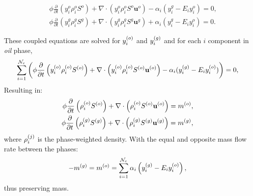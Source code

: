            \begin{subequations}
             \begin{align}
               && \phi  \displaystyle\frac{\partial}{\partial t}\left(y_{i}^{o}\rho_i^{o}S^{o} \right) + \nabla\cdot\left(y_{i}^{o}\rho_i^{o}S^{o}\mathbf{u}^{o}  \right) - \alpha_i (y_i^g - E_i y_i^o)  = 0, \label{oil-comp-i} \\
               && \phi \displaystyle\frac{\partial}{\partial t}\left(y_{i}^{g}\rho_i^{g}S^{g}  \right) +  \nabla\cdot\left( y_{i}^{g}\rho_i^{g}S^{g}\mathbf{u}^{g}  \right) + \alpha_i (y_i^g - E_i y_i^o) = 0. \label{water-comp-i}
            \end{align} %
           \end{subequations}

These coupled equations are solved for $\mfr[y]{i}{o}$ and $\mfr[y]{i}{g}$ and for each $i$ component in {\it oil} phase, 
           \begin{equation}
              \summation_{i=1}^{{\cal N}_{c}} \bigg(\phi \displaystyle\frac{\partial}{\partial t}\left(\mfr[y]{i}{o}\mfr[\rho]{i}{o}\mfr[S]{}{o} \right) + \nabla\cdot\left(\mfr[y]{i}{o}\mfr[\rho]{i}{o}\mfr[S]{}{o}\mfr[\mathbf{u}]{}{o}  \right) - \alpha_i (\mfr[y]{i}{g} - E_i \mfr[y]{i}{o})\bigg)  = 0, 
           \end{equation}
Resulting in:
           \begin{eqnarray}
              \phi \displaystyle\frac{\partial}{\partial t}\left( \mfr[\rho]{i}{o}\mfr[S]{}{o} \right) + \nabla\cdot\left(\mfr[\rho]{i}{o}\mfr[S]{}{o}\mfr[\mathbf{u}]{}{o}  \right) = \mfr[m]{}{o}, \nonumber \\
              \phi \displaystyle\frac{\partial}{\partial t}\left( \mfr[\rho]{i}{g}\mfr[S]{}{g} \right) + \nabla\cdot\left(\mfr[\rho]{i}{g}\mfr[S]{}{g}\mfr[\mathbf{u}]{}{g}  \right) = \mfr[m]{}{g}, \nonumber 
           \end{eqnarray}
where $\mfr[\rho]{i}{j}$ is the phase-weighted density. With the equal and opposite mass flow rate between the phases: 
           \begin{displaymath}
                -\mfr[m]{}{g} = \mfr[m]{}{o}= \summation_{i=1}^{{\cal N}_{c}}\alpha_i \left(\mfr[y]{i}{g} - E_i \mfr[y]{i}{o}\right), 
           \end{displaymath}
thus preserving mass.


